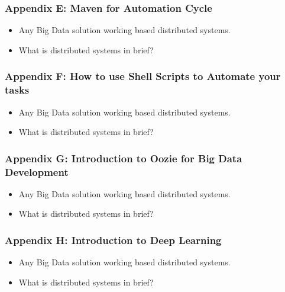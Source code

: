 
\begin{frame}
  \frametitle{Appendix E: Maven for Automation Cycle}
	\begin{itemize}[<+->]
		\item Any Big Data solution working based distributed systems.
		\item What is distributed systems in brief?
	\end{itemize}
\end{frame}


\begin{frame}
  \frametitle{Appendix F: How to use Shell Scripts to Automate your tasks}
	\begin{itemize}[<+->]
		\item Any Big Data solution working based distributed systems.
		\item What is distributed systems in brief?
	\end{itemize}
\end{frame}



\begin{frame}
  \frametitle{Appendix G: Introduction to Oozie for Big Data Development}
	\begin{itemize}[<+->]
		\item Any Big Data solution working based distributed systems.
		\item What is distributed systems in brief?
	\end{itemize}
\end{frame}


\begin{frame}
  \frametitle{Appendix H: Introduction to Deep Learning}
	\begin{itemize}[<+->]
		\item Any Big Data solution working based distributed systems.
		\item What is distributed systems in brief?
	\end{itemize}
\end{frame}

